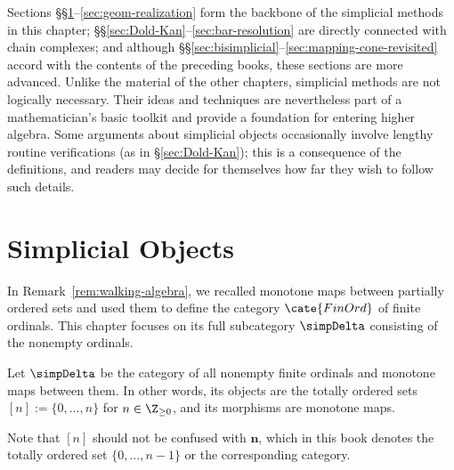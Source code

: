 \begin{wenxintishi}
	Sections \S\S\ref{sec:simplicial-method}--\ref{sec:geom-realization} form
	the backbone of the simplicial methods in this chapter;
	\S\S\ref{sec:Dold-Kan}--\ref{sec:bar-resolution} are directly connected
	with chain complexes; and although
	\S\S\ref{sec:bisimplicial}--\ref{sec:mapping-cone-revisited} accord with
	the contents of the preceding books, these sections are more advanced.
	Unlike the material of the other chapters, simplicial methods are not
	logically necessary. Their ideas and techniques are nevertheless part of a
	mathematician's basic toolkit and provide a foundation for entering higher
	algebra. Some arguments about simplicial objects occasionally involve
	lengthy routine verifications (as in \S\ref{sec:Dold-Kan}); this is a
	consequence of the definitions, and readers may decide for themselves how
	far they wish to follow such details.
\end{wenxintishi}

\section{Simplicial Objects}\label{sec:simplicial-method}
In Remark~\ref{rem:walking-algebra}, we recalled monotone maps between
partially ordered sets and used them to define the category $\cate{FinOrd}$
of finite ordinals. This chapter focuses on its full subcategory
$\simpDelta$ consisting of the nonempty ordinals.

\begin{definition}
	\index[sym1]{[n]}
	Let $\simpDelta$ be the category of all nonempty finite ordinals and
	monotone maps between them. In other words, its objects are the totally
	ordered sets $[n]:=\{0,\ldots,n\}$ for $n\in\Z_{\geq0}$, and its morphisms
	are monotone maps.
\end{definition}

Note that $[n]$ should not be confused with $\mathbf{n}$, which in this book
denotes the totally ordered set $\{0,\ldots,n-1\}$ or the corresponding
category.

